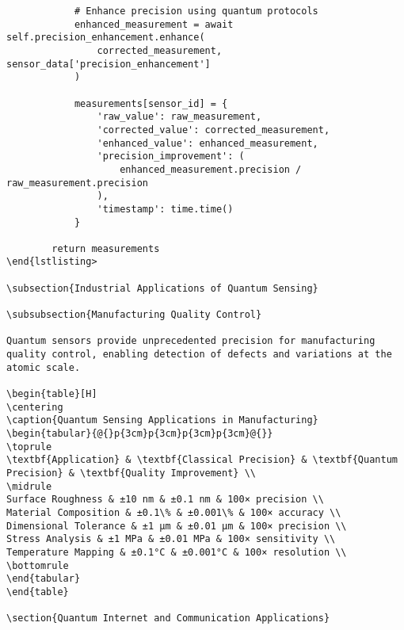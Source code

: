 \documentclass[12pt,a4paper]{report}
\begin{document}
\begin{lstlisting}
            # Enhance precision using quantum protocols
            enhanced_measurement = await self.precision_enhancement.enhance(
                corrected_measurement, sensor_data['precision_enhancement']
            )

            measurements[sensor_id] = {
                'raw_value': raw_measurement,
                'corrected_value': corrected_measurement,
                'enhanced_value': enhanced_measurement,
                'precision_improvement': (
                    enhanced_measurement.precision / raw_measurement.precision
                ),
                'timestamp': time.time()
            }

        return measurements
\end{lstlisting>

\subsection{Industrial Applications of Quantum Sensing}

\subsubsection{Manufacturing Quality Control}

Quantum sensors provide unprecedented precision for manufacturing quality control, enabling detection of defects and variations at the atomic scale.

\begin{table}[H]
\centering
\caption{Quantum Sensing Applications in Manufacturing}
\begin{tabular}{@{}p{3cm}p{3cm}p{3cm}p{3cm}@{}}
\toprule
\textbf{Application} & \textbf{Classical Precision} & \textbf{Quantum Precision} & \textbf{Quality Improvement} \\
\midrule
Surface Roughness & ±10 nm & ±0.1 nm & 100× precision \\
Material Composition & ±0.1\% & ±0.001\% & 100× accuracy \\
Dimensional Tolerance & ±1 μm & ±0.01 μm & 100× precision \\
Stress Analysis & ±1 MPa & ±0.01 MPa & 100× sensitivity \\
Temperature Mapping & ±0.1°C & ±0.001°C & 100× resolution \\
\bottomrule
\end{tabular}
\end{table}

\section{Quantum Internet and Communication Applications}


\end{lstlisting}
\end{document}
